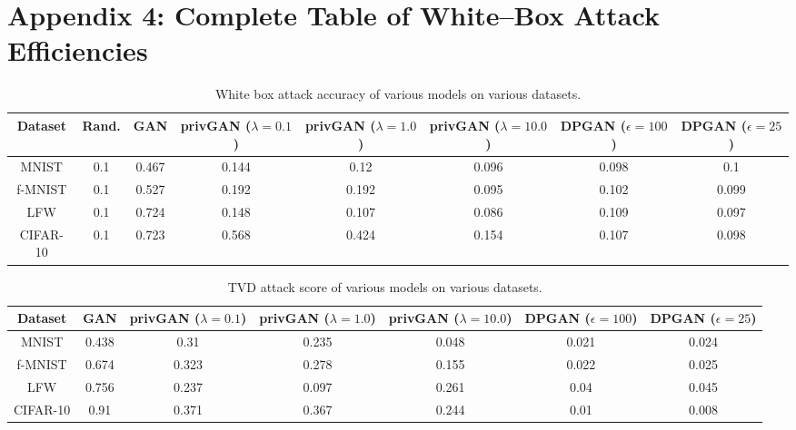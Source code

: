 \documentclass{article}
\begin{document}
\onecolumn

\section*{Appendix 4: Complete Table of White--Box Attack Efficiencies}

\begin{table*}[h!]
\small
\begin{center}
\begin{tabular}{ c|c|c|c|c|c|c|c } 
 \hline
 Dataset & Rand. & GAN & privGAN ($\lambda=0.1$) & privGAN ($\lambda=1.0$) & privGAN ($\lambda=10.0$)  & DPGAN ($\epsilon=100$) & DPGAN ($\epsilon=25$)
 \\ \hline
 MNIST  & 0.1 & 0.467 & 0.144 & 0.12 & 0.096 & 0.098 & 0.1\\ 
 f-MNIST  & 0.1 & 0.527 & 0.192 & 0.192 & 0.095  & 0.102 & 0.099\\
 LFW & 0.1 & 0.724 & 0.148 & 0.107 & 0.086 & 0.109 & 0.097\\ 
 CIFAR-10 & 0.1 & 0.723 & 0.568 & 0.424 & 0.154 & 0.107 & 0.098\\
 \hline
\end{tabular}
\end{center}
 \caption{White box attack accuracy of various models on various datasets.}
 \label{SuppTable1}
\end{table*}

\begin{table*}[h!]
\small
\begin{center}
\begin{tabular}{ c|c|c|c|c|c|c } 
 \hline
 Dataset & GAN & privGAN ($\lambda=0.1$) & privGAN ($\lambda=1.0$) & privGAN ($\lambda=10.0$)  & DPGAN ($\epsilon=100$) & DPGAN ($\epsilon=25$)
 \\ \hline
 MNIST  & 0.438 & 0.31 & 0.235 & 0.048 & 0.021 & 0.024\\ 
 f-MNIST  & 0.674 & 0.323 & 0.278 & 0.155 & 0.022 & 0.025\\
 LFW & 0.756 & 0.237 & 0.097 & 0.261 & 0.04 & 0.045\\ 
 CIFAR-10 & 0.91 & 0.371 & 0.367 & 0.244 & 0.01 & 0.008\\
 \hline
\end{tabular}
\end{center}
 \caption{TVD attack score of various models on various datasets.}
 \label{SuppTable2}
\end{table*}
\end{document}
